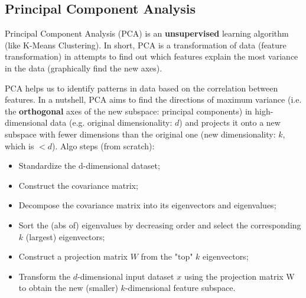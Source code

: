 \documentclass[11pt]{article}
\begin{document}
\subsection{Principal Component Analysis}
Principal Component Analysis (PCA) is an \textbf{unsupervised} learning algorithm (like K-Means Clustering). In short, PCA is a transformation of data (feature transformation) in attempts to find out which features explain the most variance in the data (graphically find the new axes). 

PCA helps us to identify patterns in data based on the correlation between features. In a nutshell, PCA aims to find the directions of maximum variance  (i.e. the \textbf{orthogonal} axes of the new subspace: principal components) in high-dimensional data (e.g. original dimensionality: $d$) and projects it onto a new subspace with fewer dimensions than the original one (new dimensionality: $k$, which is $<d$). Algo steps (from scratch):
\begin{itemize}
	\item Standardize the d-dimensional dataset;
	\item Construct the covariance matrix;
	\item Decompose the covariance matrix into its eigenvectors and eigenvalues;   
	\item Sort the (abs of) eigenvalues by decreasing order and select the corresponding $k$ (largest) eigenvectors;
	\item Construct a projection matrix $W$ from the "top" $k$ eigenvectors;
	\item Transform the $d$-dimensional input dataset $x$ using the projection matrix W to obtain the new (smaller) $k$-dimensional feature subspace.
\end{itemize}
\end{document}
